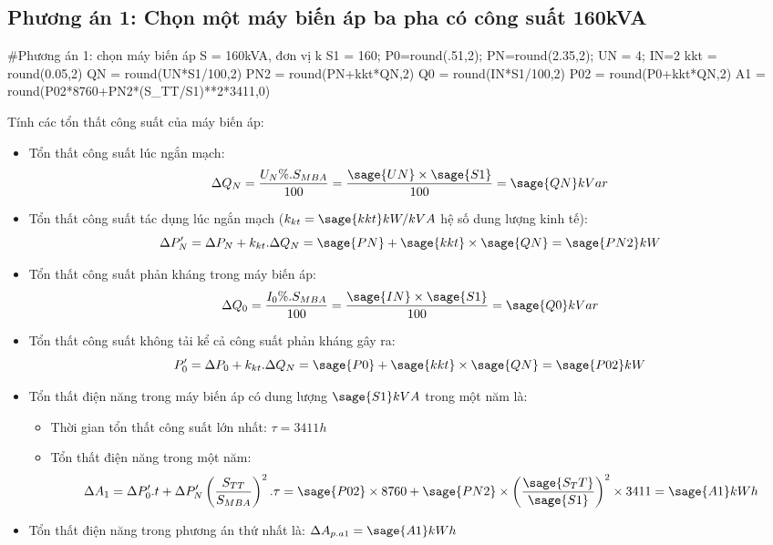 \documentclass[12pt,a4paper]{article}
\begin{document}
\subsection{Phương án 1: Chọn một máy biến áp ba pha có công suất 160kVA}
\begin{sagesilent}
#Phương án 1: chọn máy biến áp S = 160kVA, đơn vị k
S1 = 160; P0=round(.51,2); PN=round(2.35,2); UN = 4; IN=2
kkt = round(0.05,2)
QN = round(UN*S1/100,2)
PN2 = round(PN+kkt*QN,2)
Q0 = round(IN*S1/100,2)
P02 = round(P0+kkt*QN,2)
A1 = round(P02*8760+PN2*(S_TT/S1)**2*3411,0)
\end{sagesilent}
\hspace{.6cm}Tính các tổn thất công suất của máy biến áp:
\begin{itemize}
\item Tổn thất công suất lúc ngắn mạch: $$ \Delta Q_N = \frac{U_N\%.S_{MBA}}{100}=\frac{\sage{UN}\times\sage{S1}}{100} = \sage{QN}kVar$$
\item Tổn thất công suất tác dụng lúc ngắn mạch ($k_{kt} = \sage{kkt} kW/kVA$ hệ số dung lượng kinh tế):$$ \Delta P_N^\prime = \Delta P_N + k_{kt}.\Delta Q_N = \sage{PN}+\sage{kkt}\times\sage{QN}=\sage{PN2}kW$$
\item Tổn thất công suất phản kháng trong máy biến áp: $$ \Delta Q_0 = \frac{I_0\%.S_{MBA}}{100}=\frac{\sage{IN}\times\sage{S1}}{100} = \sage{Q0}kVar$$
\item Tổn thất công suất không tải kể cả công suất phản kháng gây ra:$$ P_0^\prime = \Delta P_0 + k_{kt}.\Delta Q_N = \sage{P0}+\sage{kkt}\times\sage{QN}=\sage{P02}kW$$
\item Tổn thất điện năng trong máy biến áp có dung lượng $\sage{S1}kVA$ trong một năm là: 
\begin{itemize}
\item Thời gian tổn thất công suất lớn nhất: $\tau = 3411h$
\item Tổn thất điện năng trong một năm: $$\Delta A_1 = \Delta P_0^\prime .t + \Delta P_N^\prime \left({\frac{S_{TT}}{S_{MBA}}}\right)^2.\tau=\sage{P02} \times 8760+\sage{PN2} \times \left({\frac{\sage{S_TT}}{\sage{S1}}}\right)^2\times 3411=\sage{A1}kWh$$
\end{itemize}
\item Tổn thất điện năng trong phương án thứ nhất là: $\Delta A_{p.a1}=\sage{A1}kWh$
\end{itemize}
\end{document}
